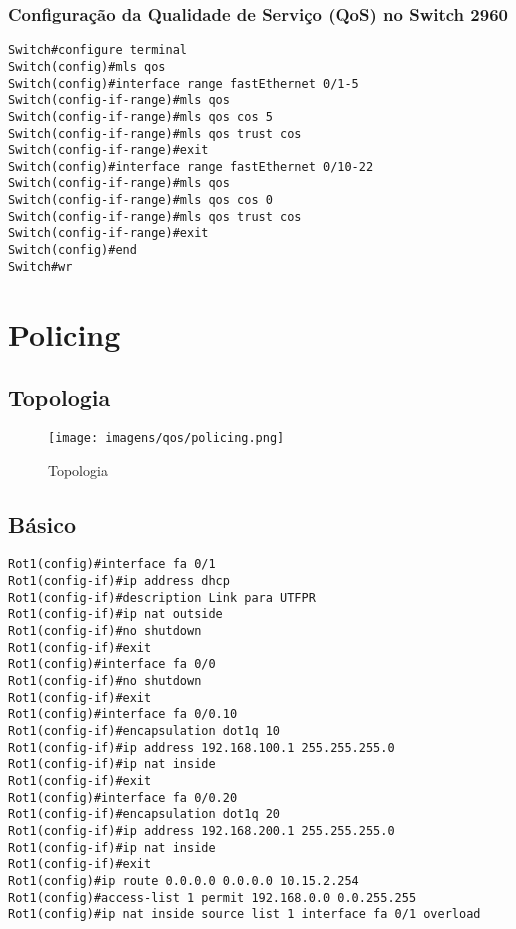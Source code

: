\documentclass[]{article}
\begin{document}
\hypertarget{configurauxe7uxe3o-da-qualidade-de-serviuxe7o-qos-no-switch-2960}{%
\subsubsection{Configuração da Qualidade de Serviço (QoS) no Switch
2960}\label{configurauxe7uxe3o-da-qualidade-de-serviuxe7o-qos-no-switch-2960}}

\begin{verbatim}
Switch#configure terminal
Switch(config)#mls qos
Switch(config)#interface range fastEthernet 0/1-5
Switch(config-if-range)#mls qos
Switch(config-if-range)#mls qos cos 5
Switch(config-if-range)#mls qos trust cos
Switch(config-if-range)#exit
Switch(config)#interface range fastEthernet 0/10-22
Switch(config-if-range)#mls qos
Switch(config-if-range)#mls qos cos 0
Switch(config-if-range)#mls qos trust cos
Switch(config-if-range)#exit
Switch(config)#end
Switch#wr
\end{verbatim}

\hypertarget{policing}{%
\section{Policing}\label{policing}}

\hypertarget{topologia}{%
\subsection{Topologia}\label{topologia}}

\begin{figure}
\centering
\texttt{[image: imagens/qos/policing.png]}
\caption{Topologia}
\end{figure}

\hypertarget{buxe1sico}{%
\subsection{Básico}\label{buxe1sico}}

\begin{verbatim}
Rot1(config)#interface fa 0/1
Rot1(config-if)#ip address dhcp
Rot1(config-if)#description Link para UTFPR
Rot1(config-if)#ip nat outside
Rot1(config-if)#no shutdown
Rot1(config-if)#exit
Rot1(config)#interface fa 0/0
Rot1(config-if)#no shutdown
Rot1(config-if)#exit
Rot1(config)#interface fa 0/0.10
Rot1(config-if)#encapsulation dot1q 10
Rot1(config-if)#ip address 192.168.100.1 255.255.255.0
Rot1(config-if)#ip nat inside
Rot1(config-if)#exit
Rot1(config)#interface fa 0/0.20
Rot1(config-if)#encapsulation dot1q 20
Rot1(config-if)#ip address 192.168.200.1 255.255.255.0
Rot1(config-if)#ip nat inside
Rot1(config-if)#exit
Rot1(config)#ip route 0.0.0.0 0.0.0.0 10.15.2.254
Rot1(config)#access-list 1 permit 192.168.0.0 0.0.255.255
Rot1(config)#ip nat inside source list 1 interface fa 0/1 overload
\end{verbatim}
\end{document}
